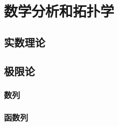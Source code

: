 

\chapter{数学分析和拓扑学}


\section{实数理论}



\section{极限论}

\begin{definition}[序列]
    
\end{definition}
\begin{definition}[滤子基]
    
\end{definition}
\begin{definition}[上、下极限]
    
\end{definition}
\begin{definition}[极限]
    
\end{definition}

\subsection{数列}

\subsection{函数列}


